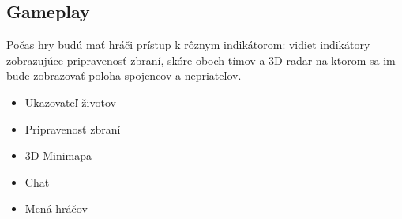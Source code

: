 \documentclass[a4paper]{report}
\begin{document}
\subsection{Gameplay}
Počas hry budú mať hráči prístup k rôznym indikátorom: vidiet indikátory zobrazujúce pripravenosť zbraní, skóre oboch tímov a 3D radar na ktorom sa im bude zobrazovať poloha spojencov a nepriateľov.
\begin{itemize}
  \item Ukazovateľ životov
  \item Pripravenosť zbraní
  \item 3D Minimapa
  \item Chat
  \item Mená hráčov
\end{itemize} 
\end{document}
